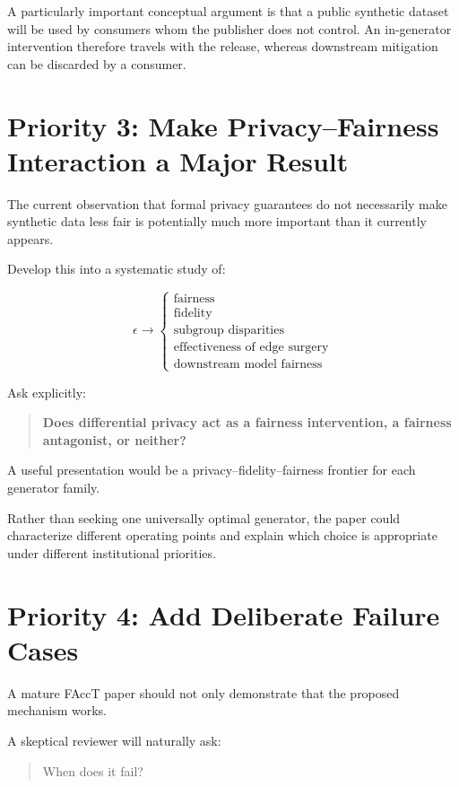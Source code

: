 \documentclass[11pt]{article}
\begin{document}
A particularly important conceptual argument is that a public synthetic dataset will be used by consumers whom the publisher does not control. An in-generator intervention therefore travels with the release, whereas downstream mitigation can be discarded by a consumer.

\section*{Priority 3: Make Privacy--Fairness Interaction a Major Result}

The current observation that formal privacy guarantees do not necessarily make synthetic data less fair is potentially much more important than it currently appears.

Develop this into a systematic study of:

\[
\epsilon \longrightarrow
\begin{cases}
\text{fairness}\\
\text{fidelity}\\
\text{subgroup disparities}\\
\text{effectiveness of edge surgery}\\
\text{downstream model fairness}
\end{cases}
\]

Ask explicitly:

\begin{quote}
\textbf{Does differential privacy act as a fairness intervention, a fairness antagonist, or neither?}
\end{quote}

A useful presentation would be a privacy--fidelity--fairness frontier for each generator family.

Rather than seeking one universally optimal generator, the paper could characterize different operating points and explain which choice is appropriate under different institutional priorities.

\section*{Priority 4: Add Deliberate Failure Cases}

A mature FAccT paper should not only demonstrate that the proposed mechanism works.

A skeptical reviewer will naturally ask:

\begin{quote}
When does it fail?
\end{quote}
\end{document}
